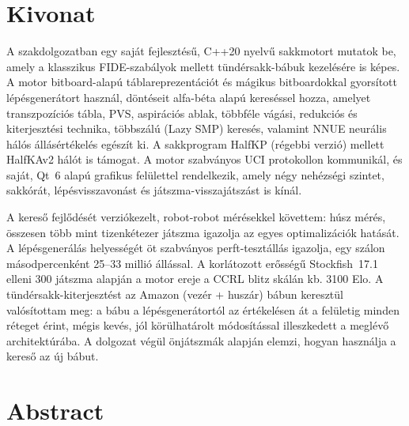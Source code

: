 \setcounter{page}{1}

\selecthungarian

\chapter*{Kivonat}

A szakdolgozatban egy saját fejlesztésű, C++20 nyelvű sakkmotort mutatok be, amely a klasszikus FIDE-szabályok mellett tündérsakk-bábuk kezelésére is képes. A motor bitboard-alapú táblareprezentációt és mágikus bitboardokkal gyorsított lépésgenerátort használ, döntéseit alfa-béta alapú kereséssel hozza, amelyet transzpozíciós tábla, PVS, aspirációs ablak, többféle vágási, redukciós és kiterjesztési technika, többszálú (Lazy SMP) keresés, valamint NNUE neurális hálós állásértékelés egészít ki. A sakkprogram HalfKP (régebbi verzió) mellett HalfKAv2 hálót is támogat. A motor szabványos UCI protokollon kommunikál, és saját, Qt~6 alapú grafikus felülettel rendelkezik, amely négy nehézségi szintet, sakkórát, lépésvisszavonást és játszma-visszajátszást is kínál.

A kereső fejlődését verziókezelt, robot-robot mérésekkel követtem: húsz mérés, összesen több mint tizenkétezer játszma igazolja az egyes optimalizációk hatását. A lépésgenerálás helyességét öt szabványos perft-tesztállás igazolja, egy szálon másodpercenként 25--33 millió állással. A korlátozott erősségű Stockfish~17.1 elleni 300 játszma alapján a motor ereje a CCRL blitz skálán kb. 3100 Elo. A tündérsakk-kiterjesztést az Amazon (vezér + huszár) bábun keresztül valósítottam meg: a bábu a lépésgenerátortól az értékelésen át a felületig minden réteget érint, mégis kevés, jól körülhatárolt módosítással illeszkedett a meglévő architektúrába. A dolgozat végül önjátszmák alapján elemzi, hogyan használja a kereső az új bábut.

\vfill
\selectenglish

\chapter*{Abstract}

